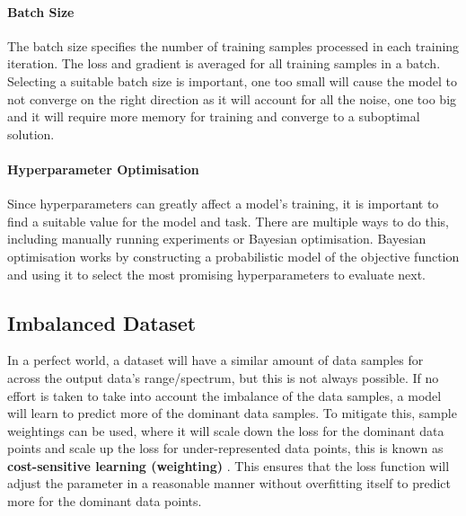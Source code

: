 \paragraph{Batch Size} \label{ML:BatchSize} The batch size specifies the number of training samples processed in each training iteration. The loss and gradient is averaged for all training samples in a batch. Selecting a suitable batch size is important, one too small will cause the model to not converge on the right direction as it will account for all the noise, one too big and it will require more memory for training and converge to a suboptimal solution.


\paragraph{Hyperparameter Optimisation} Since hyperparameters can greatly affect a model's training, it is important to find a suitable value for the model and task. There are multiple ways to do this, including manually running experiments or Bayesian optimisation. Bayesian optimisation works by constructing a probabilistic model of the objective function and using it to select the most promising hyperparameters to evaluate next. 

\subsection{Imbalanced Dataset}
In a perfect world, a dataset will have a similar amount of data samples for across the output data's range/spectrum, but this is not always possible. If no effort is taken to take into account the imbalance of the data samples, a model will learn to predict more of the dominant data samples. To mitigate this, sample weightings can be used, where it will scale down the loss for the dominant data points and scale up the loss for under-represented data points, this is known as \textbf{cost-sensitive learning (weighting)} \cite{ImbalancedDataset}. This ensures that the loss function will adjust the parameter in a reasonable manner without overfitting itself to predict more for the dominant data points.

